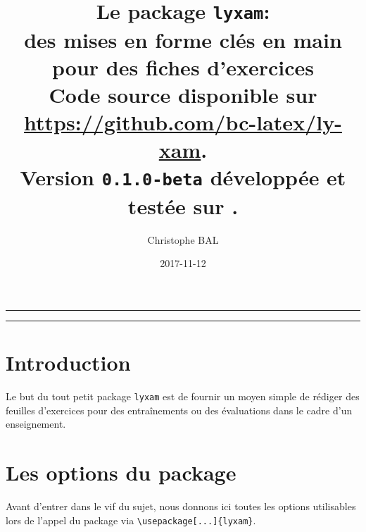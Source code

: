 \documentclass[12pt,a4paper]{scrartcl}
\theoremstyle{definition}
\begin{document}
\title{%
	Le package \texttt{lyxam}:\\%
	des mises en forme clés en main\\%
	pour des fiches d'exercices\\%
	{\footnotesize Code source disponible sur \url{https://github.com/bc-latex/ly-xam}.}\\%
	{\footnotesize Version \texttt{0.1.0-beta} développée et testée sur \macosxname{}.}%
}
\author{Christophe BAL}
\date{2017-11-12}

\maketitle


\vspace{2em}

\hrule

\tableofcontents

\vspace{1.5em}

\hrule

\newpage



\section{Introduction}

Le but du tout petit package \verb+lyxam+ est de fournir un moyen simple de rédiger des feuilles d'exercices pour des entraînements ou des évaluations dans le cadre d'un enseignement.




\section{Les options du package}

Avant d'entrer dans le vif du sujet, nous donnons ici toutes les options utilisables lors de l'appel du package via \verb+\usepackage[...]{lyxam}+.
\end{document}

